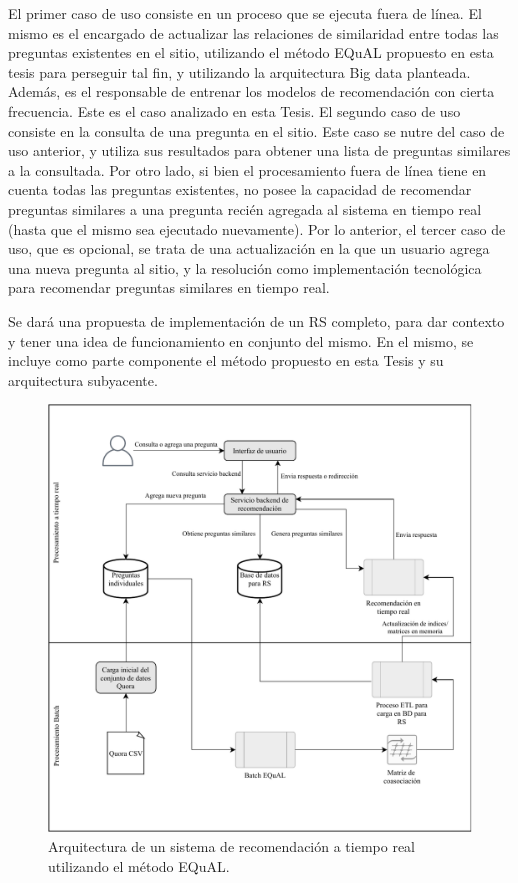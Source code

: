 \bigskip El primer caso de uso consiste en un proceso que se ejecuta fuera de línea. El mismo es el encargado de actualizar las relaciones de similaridad entre todas las preguntas existentes en el sitio, utilizando el método EQuAL propuesto en esta tesis para perseguir tal fin, y utilizando la arquitectura Big data planteada. Además, es el responsable de entrenar los modelos de recomendación con cierta frecuencia. Este es el caso analizado en esta Tesis. El segundo caso de uso consiste en la consulta de una pregunta en el sitio. Este caso se nutre del caso de uso anterior, y utiliza sus resultados para obtener una lista de preguntas similares a la consultada. Por otro lado, si bien el procesamiento fuera de línea tiene en cuenta todas las preguntas existentes, no posee la capacidad de recomendar preguntas similares a una pregunta recién agregada al sistema en tiempo real (hasta que el mismo sea ejecutado nuevamente). Por lo anterior, el tercer caso de uso, que es opcional, se trata de una actualización en la que un usuario agrega una nueva pregunta al sitio, y la resolución como implementación tecnológica para recomendar preguntas similares en tiempo real.

\bigskip Se dará una propuesta de implementación de un RS completo, para dar contexto y tener una idea de funcionamiento en conjunto del mismo. En el mismo, se incluye como parte componente el método propuesto en esta Tesis y su arquitectura subyacente.

\bigskip
\begin{figure}[h!]
	\centering
	\includegraphics[width=0.9\linewidth]{8_problema_investigacion/imagenes/implementacion_rs}
	\caption{Arquitectura de un sistema de recomendación a tiempo real utilizando el método EQuAL.}
	\label{fig:implementacionrs}
\end{figure}


